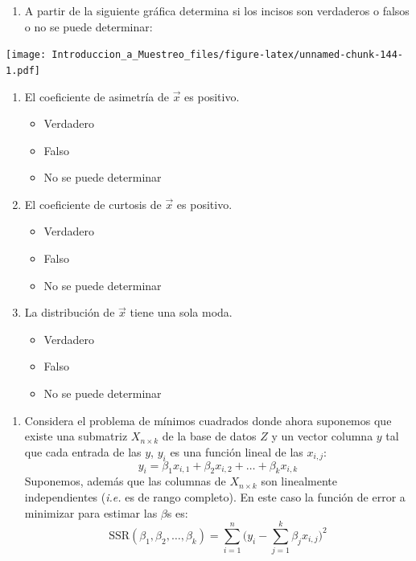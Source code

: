 \documentclass[
]{book}
\providecommand{\tightlist}{%
  \setlength{\itemsep}{0pt}\setlength{\parskip}{0pt}}
\begin{document}
\begin{enumerate}
\def\labelenumi{\arabic{enumi}.}
\setcounter{enumi}{26}
\tightlist
\item
  A partir de la siguiente gráfica determina si los incisos son verdaderos o falsos o no se puede determinar:
\end{enumerate}

\texttt{[image: Introduccion\_a\_Muestreo\_files/figure-latex/unnamed-chunk-144-1.pdf]}

\begin{enumerate}
\def\labelenumi{\alph{enumi}.}
\tightlist
\item
  El coeficiente de asimetría de \(\vec{x}\) es positivo.

  \begin{itemize}
  \tightlist
  \item
    Verdadero
  \item
    Falso
  \item
    No se puede determinar
  \end{itemize}
\item
  El coeficiente de curtosis de \(\vec{x}\) es positivo.

  \begin{itemize}
  \tightlist
  \item
    Verdadero
  \item
    Falso
  \item
    No se puede determinar
  \end{itemize}
\item
  La distribución de \(\vec{x}\) tiene una sola moda.

  \begin{itemize}
  \tightlist
  \item
    Verdadero
  \item
    Falso
  \item
    No se puede determinar
  \end{itemize}
\end{enumerate}

\begin{enumerate}
\def\labelenumi{\arabic{enumi}.}
\setcounter{enumi}{27}
\tightlist
\item
  Considera el problema de mínimos cuadrados donde ahora suponemos que existe una submatriz \(X_{n \times k}\) de la base de datos \(Z\) y un vector columna \(y\) tal que cada entrada de las \(y\), \(y_i\) es una función lineal de las \(x_{i,j}\):
  \[
  y_i = \beta_1 x_{i,1} + \beta_2 x_{i,2} + \dots + \beta_k x_{i,k}
  \]
  Suponemos, además que las columnas de \(X_{n \times k}\) son linealmente independientes (\emph{i.e.} es de rango completo). En este caso la función de error a minimizar para estimar las \(\beta\)s es:
  \[
  \text{SSR}(\beta_1, \beta_2, \dots, \beta_k) = \sum\limits_{i=1}^n \big( y_i - \sum\limits_{j=1}^k \beta_j x_{i,j}\big)^2
  \]
\end{enumerate}
\end{document}
